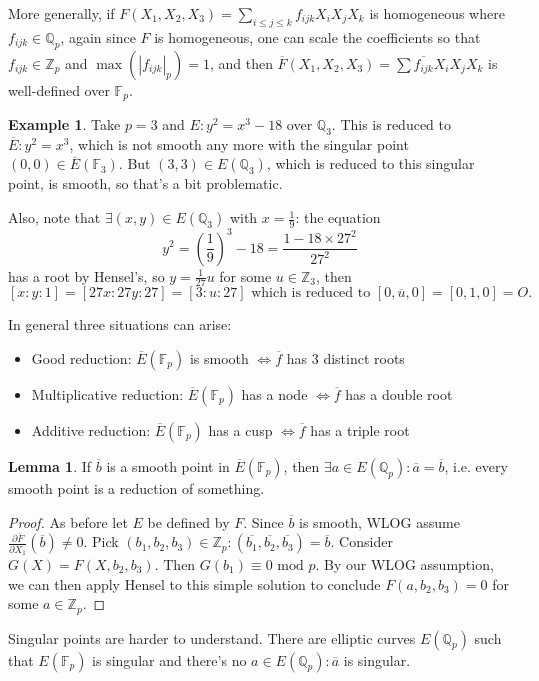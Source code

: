 \documentclass{article}
\newcommand{\F}{\mathbb{F}}
\newcommand{\Z}{\mathbb{Z}}
\newcommand{\Q}{\mathbb{Q}}
\newcommand{\Mod}{\text{ mod }}
\theoremstyle{definition}
\newtheorem{lemma}[defn]{Lemma}
\newtheorem{example}[defn]{Example}
\begin{document}
More generally, if $F(X_1,X_2,X_3)=\sum_{i\leq j\leq k}f_{ijk}X_iX_jX_k$ is homogeneous where $f_{ijk}\in\Q_p$, again since $F$ is homogeneous, one can scale the coefficients so that $f_{ijk}\in\Z_p$ and $\max(|f_{ijk}|_p)=1$, and then $\overline F(X_1,X_2,X_3)=\sum\overline{f_{ijk}}X_iX_jX_k$ is well-defined over $\F_p$.

\begin{example}
Take $p=3$ and $E:y^2=x^3-18$ over $\Q_3$. This is reduced to $\overline E:y^2=x^3$, which is not smooth any more with the singular point $(0,0)\in\overline E(\F_3)$. But $(3,3)\in E(\Q_3)$, which is reduced to this singular point, is smooth, so that's a bit problematic.

Also, note that $\exists (x,y)\in E(\Q_3)$ with $x=\frac19$: the equation
\[
y^2=\left(\frac{1}{9}\right)^3-18=\frac{1-18\times 27^2}{27^2}
\]
has a root by Hensel's, so $y=\frac{1}{27}u$ for some $u\in\Z_3$, then
\[
[x:y:1]=[27x:27y:27]=[3:u:27]\text{ which is reduced to }[0,\overline u,0]=[0,1,0]=O.
\]
\end{example}

In general three situations can arise:
\begin{itemize}
\item Good reduction: $\overline E(\F_p)$ is smooth $\iff \overline f$ has 3 distinct roots
\item Multiplicative reduction: $\overline E(\F_p)$ has a node $\iff \overline f$ has a double root
\item Additive reduction: $\overline E(\F_p)$ has a cusp $\iff \overline f$ has a triple root
\end{itemize}

\begin{lemma}
If $\overline b$ is a smooth point in $\overline E(\F_p)$, then $\exists a\in E(\Q_p):\overline a=\overline b$, i.e. every smooth point is a reduction of something.
\end{lemma}
\begin{proof}
As before let $E$ be defined by $F$. Since $\overline b$ is smooth, WLOG assume $\frac{\partial\overline F}{\partial X_1}(\overline b)\neq 0$. Pick $(b_1,b_2,b_3)\in\Z_p:(\overline{b_1},\overline{b_2},\overline{b_3})=\overline b$. Consider $G(X)=F(X,b_2,b_3)$. Then $G(b_1)\equiv 0\Mod p$. By our WLOG assumption, we can then apply Hensel to this simple solution to conclude $F(a,b_2,b_3)=0$ for some $a\in\Z_p$. 
\end{proof}

Singular points are harder to understand. There are elliptic curves $E(\Q_p)$ such that $E(\F_p)$ is singular and there's no $a\in E(\Q_p):\overline a$ is singular.
\end{document}
